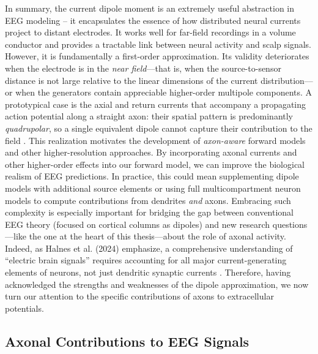 \documentclass[final, a4paper,masters,en,listoffigures,listoftables,norwegiandates]{NMBU}
\begin{document}
In summary, the current dipole moment is an extremely useful abstraction in EEG modeling – it encapsulates the essence of how distributed neural currents project to distant electrodes. It works well for far-field recordings in a volume conductor and provides a tractable link between neural activity and scalp signals. However, it is fundamentally a first-order approximation. Its validity deteriorates when the electrode is in the \emph{near field}––that is, when the source-to-sensor distance is not large relative to the linear dimensions of the current distribution––or when the generators contain appreciable higher-order multipole components.  A prototypical case is the axial and return currents that accompany a propagating action potential along a straight axon: their spatial pattern is predominantly \emph{quadrupolar}, so a single equivalent dipole cannot capture their contribution to the field \cite{McColgan2017}. This realization motivates the development of \textit{axon-aware} forward models and other higher-resolution approaches. By incorporating axonal currents and other higher-order effects into our forward model, we can improve the biological realism of EEG predictions. In practice, this could mean supplementing dipole models with additional source elements or using full multicompartment neuron models to compute contributions from dendrites \emph{and} axons. Embracing such complexity is especially important for bridging the gap between conventional EEG theory (focused on cortical columns as dipoles) and new research questions—like the one at the heart of this thesis—about the role of axonal activity. Indeed, as Halnes et al. (2024) emphasize, a comprehensive understanding of “electric brain signals” requires accounting for all major current-generating elements of neurons, not just dendritic synaptic currents \cite{Halnes2024ElectricBrainSignals}. Therefore, having acknowledged the strengths and weaknesses of the dipole approximation, we now turn our attention to the specific contributions of axons to extracellular potentials.

\subsection{Axonal Contributions to EEG Signals}\label{subsec:AxonalContributions}
\end{document}
